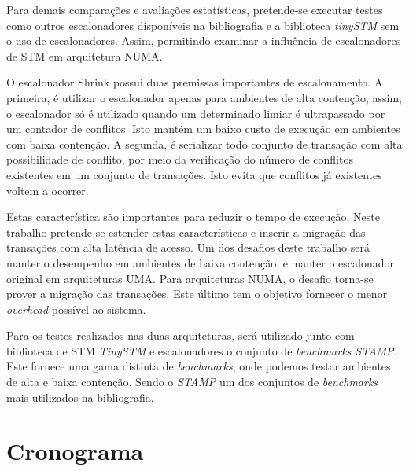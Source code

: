 \documentclass[diss-proposta,nocipinfo]{texufpel}
\begin{document}
Para demais comparações e avaliações estatísticas, pretende-se executar testes como outros escalonadores disponíveis na bibliografia e a biblioteca \emph{tinySTM} sem o uso de escalonadores. Assim, permitindo examinar a influência de escalonadores de STM em arquitetura NUMA.

O escalonador Shrink possui duas premissas importantes de escalonamento. A primeira, é utilizar o escalonador apenas para ambientes de alta contenção, assim, o escalonador só é utilizado quando um determinado limiar é ultrapassado por um contador de conflitos. Isto mantém um baixo custo de execução em ambientes com baixa contenção. A segunda, é serializar todo conjunto de transação com alta possibilidade de conflito, por meio da verificação do número de conflitos existentes em um conjunto de transações. Isto evita que conflitos já existentes voltem a ocorrer.

Estas característica são importantes para reduzir o tempo de execução. Neste trabalho pretende-se estender estas características e inserir a migração das transações com alta latência de acesso. Um dos desafios deste trabalho será manter o desempenho em ambientes de baixa contenção, e manter o escalonador original em arquiteturas UMA. Para arquiteturas NUMA, o desafio torna-se prover a migração das transações. Este último tem o objetivo fornecer o menor \emph{overhead} possível ao sistema.

Para os testes realizados nas duas arquiteturas, será utilizado junto com biblioteca de STM \emph{TinySTM} e escalonadores o conjunto de \emph{benchmarks STAMP}. Este fornece uma gama distinta de \emph{benchmarks}, onde podemos testar ambientes de alta e baixa contenção. Sendo o \emph{STAMP} um dos conjuntos de \emph{benchmarks} mais utilizados na bibliografia.


\chapter{Cronograma}
\end{document}
